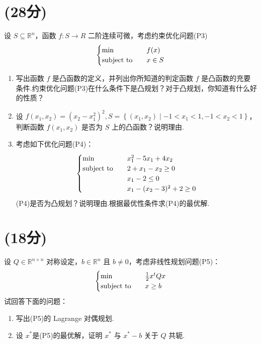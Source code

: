 \section{(28分)}
\begin{problem}
    设 $S \subseteq \mathbb{R}^n$，函数 $f: S \to R$ 二阶连续可微，考虑约束优化问题(P3)\[\begin{cases}
        \min \quad &f(x)\\
        \operatorname{subject\ to} \quad &x \in S
    \end{cases}\]
    \begin{enumerate}
        \item 写出函数 $f$ 是凸函数的定义，并列出你所知道的判定函数 $f$ 是凸函数的充要条件.约束优化问题(P3)在什么条件下是凸规划？对于凸规划，你知道有什么好的性质？
        \item 设 $f(x_1, x_2) = (x_2 - x_1^2)^2, S = \left\{(x_1, x_2) \mid -1 < x_1 < 1, -1 < x_2 < 1\right\}$，判断函数 $f(x_1, x_2)$ 是否为 $S$ 上的凸函数？说明理由.
        \item 考虑如下优化问题(P4)：\[\begin{cases}
            \min \quad &x_1^2 - 5x_1 + 4x_2\\
            \operatorname{subject\ to} \quad &2 + x_1 - x_2 \ge 0\\
            &x_1 - 2 \le 0\\
            &x_1 - (x_2 - 3)^2 + 2 \ge 0
        \end{cases}\]
        (P4)是否为凸规划？说明理由.根据最优性条件求(P4)的最优解.
    \end{enumerate}
\end{problem}

\section{(18分)}
\begin{problem}
    设 $Q \in \mathbb{R}^{n \times n}$ 对称设定，$b \in \mathbb{R}^n$ 且 $b\neq 0$，考虑非线性规划问题(P5)：\[\begin{cases}
        \min \quad &\frac{1}{2}x^tQx\\
        \operatorname{subject\ to} \quad &x \ge b
    \end{cases}\]
    试回答下面的问题：\begin{enumerate}
        \item 写出(P5)的 Lagrange 对偶规划. 
        \item 设 $x^*$是(P5)的最优解，证明 $x^*$ 与 $x^* - b$ 关于 $Q$ 共轭.
    \end{enumerate}
\end{problem}


